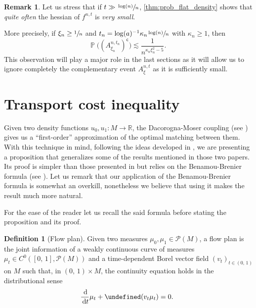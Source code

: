 \documentclass[JEP,XML,SOM,Unicode]{cedram}
\newcounter{results}[section]
\theoremstyle{plain}
\theoremstyle{definition}
\newtheorem{remark}[results]{Remark}
\newtheorem{definition}[results]{Definition}
\numberwithin{equation}{section}
\newcommand{\RR}{\ensuremath{\mathbb R}}
\renewcommand{\complement}{\ensuremath{\mathsf{c}}}\newcommand{\de}{\ensuremath{\,\mathrm d}}
\newcommand{\oo}[2]{\ensuremath{\left(#1,\,#2\right)}}
\newcommand{\bP}[1]{\ensuremath{\operatorname{\mathbb{P}}\bigl(#1\bigr)}}
\newcommand{\prob}{\ensuremath{\mathcal{P}}}
\newcommand{\cc}[2]{\ensuremath{\left[#1,\,#2\right]}}
\newcommand{\fullstop}{\ensuremath{\text{. }}}
\let\div\undefined
\DeclareMathOperator{\div}{div}
\begin{document}
\begin{remark}\label{rem:complement_event_is_negligible}
Let us stress that if $t\gg\sfrac{\log(n)}{n}$,
\cref{thm:prob_flat_density} shows that \emph{quite often} the hessian of $f^{n,t}$ is \emph{very small}.

More precisely, if $\xi_n\ge\sfrac 1n$ and $t_n = \log(a)^{-1}\kappa_n \sfrac{\log(n)}{n}$ with $\kappa_n\ge 1$, then
\begin{equation*}
\bP{(A^{n,t_n}_{\xi_n})^{\complement}} \lesssim \frac{1}{n^{\kappa_n\xi_n^2-5}} \fullstop
\end{equation*}
This observation will play a major role in the last sections as it will
allow us to ignore completely the complementary event $A^{n,t}_\xi$ as it is sufficiently small.
\end{remark}

\section{Transport cost inequality}\label{sec:transport_ineq}
Given two density functions $u_0,u_1:M\to\RR$, the Dacorogna-Moser coupling (see \cite[16-17]{Villani09}) gives
us a ``first-order'' approximation of the optimal matching between them.
With this technique in mind, following the ideas developed in \cite{Ambrosio-Stra-Trevisan2018,Ledoux2017},
we are presenting a proposition that generalizes some of the results mentioned in those two papers.
Its proof is simpler than those presented in \cite{Ambrosio-Stra-Trevisan2018,Ledoux2017}
but relies on the Benamou-Brenier formula (see \cite{Benamou-Brenier00}).
Let us remark that our application of the Benamou-Brenier formula is somewhat an overkill,
nonetheless we believe that using it makes the result much more natural.

For the ease of the reader let us recall the said formula before stating the proposition and its proof.
\begin{definition}[Flow plan]
Given two measures $\mu_0,\mu_1\in\prob(M)$, a flow plan is the joint information of a weakly
continuous curve of measures $\mu_t\in C^0(\cc01, \prob(M))$ and a time-dependent Borel
vector field $(v_t)_{t\in \oo01}$ on $M$ such that, in $\oo01\times M$,
the continuity equation holds in the distributional sense
\begin{equation*}
\frac{\de}{\de t}\mu_t+\div(v_t\mu_t)=0\fullstop
\end{equation*}
\end{definition}
\end{document}
